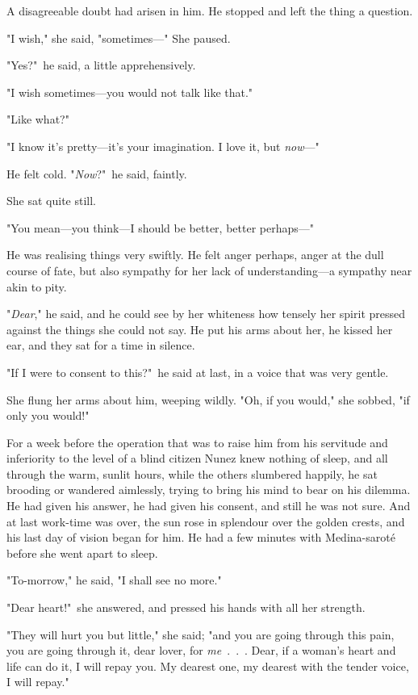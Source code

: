 \documentclass[courier]{sffms}
\begin{document}
A disagreeable doubt had arisen in him. He stopped and left the thing
a question.

"I wish," she said, "sometimes---" She paused.

"Yes?"\ he said, a little apprehensively.

"I wish sometimes---you would not talk like that."

"Like what?"

"I know it's pretty---it's your imagination. I love it, but \emph{now}---"

He felt cold. "\emph{Now}?"\ he said, faintly.

She sat quite still.

"You mean---you think---I should be better, better perhaps---"

He was realising things very swiftly. He felt anger perhaps, anger at
the dull course of fate, but also sympathy for her lack of
understanding---a sympathy near akin to pity.

"\emph{Dear}," he said, and he could see by her whiteness how tensely her
spirit pressed against the things she could not say. He put his arms
about her, he kissed her ear, and they sat for a time in silence.

"If I were to consent to this?"\ he said at last, in a voice that was
very gentle.

She flung her arms about him, weeping wildly. "Oh, if you would," she
sobbed, "if only you would!"

\newscene

For a week before the operation that was to raise him from his
servitude and inferiority to the level of a blind citizen Nunez knew
nothing of sleep, and all through the warm, sunlit hours, while the
others slumbered happily, he sat brooding or wandered aimlessly,
trying to bring his mind to bear on his dilemma.  He had given his
answer, he had given his consent, and still he was not sure.  And at
last work-time was over, the sun rose in splendour over the golden
crests, and his last day of vision began for him. He had a few minutes
with Medina-sarot\'e before she went apart to sleep.

"To-morrow," he said, "I shall see no more."

"Dear heart!"\ she answered, and pressed his hands with all her
strength.

"They will hurt you but little," she said; "and you are going through
this pain, you are going through it, dear lover, for \emph{me}~.~.~.  Dear,
if a woman's heart and life can do it, I will repay you. My dearest
one, my dearest with the tender voice, I will repay."
\end{document}
